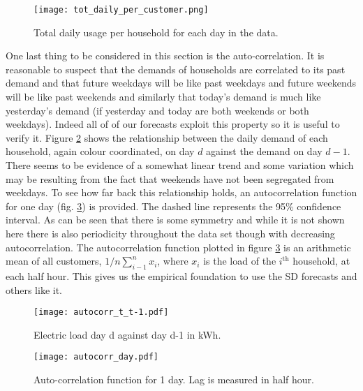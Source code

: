\begin{figure}
\centering
\texttt{[image: tot\_daily\_per\_customer.png]}
\caption{Total daily usage per household for each day in the data.}
\label{fig:totes}
\end{figure}

One last thing to be considered in this section is the auto-correlation. It is reasonable to suspect that the demands of households are correlated to its past demand and that future weekdays will be like past weekdays and future weekends will be like past weekends and similarly that today's demand is much like yesterday's demand (if yesterday and today are both weekends or both weekdays). Indeed all of of our forecasts exploit this property so it is useful to verify it.  Figure \ref{fig:ty_colour} shows the relationship between the daily demand of each household, again colour coordinated, on day $d$ against the demand on day $d-1$. There seems to be evidence of a somewhat linear trend and some variation which may be resulting from the fact that weekends have not been segregated from weekdays. To see how far back this relationship holds, an autocorrelation function for one day (fig. \ref{fig:acf_day}) is provided. The dashed line represents the 95\% confidence interval. As can be seen that there is some symmetry and while it is not shown here there is also periodicity throughout the data set though with decreasing autocorrelation. The autocorrelation function plotted in figure \ref{fig:acf_day} is an arithmetic mean of all customers, $1/n \sum_{i-1}^{n} x_i$, where $x_i$ is the load of the $i^{\text{th}}$ household, at each half hour. This gives us the empirical foundation to use the SD forecasts and others like it.

\begin{figure}
\centering
\texttt{[image: autocorr\_t\_t-1.pdf]}
\caption{Electric load day d against day d-1 in kWh.}
\label{fig:ty_colour} 
\end{figure}

\begin{figure}
\centering
\texttt{[image: autocorr\_day.pdf]}
\caption{Auto-correlation function for 1 day. Lag is measured in half hour.}
\label{fig:acf_day} 
\end{figure}




